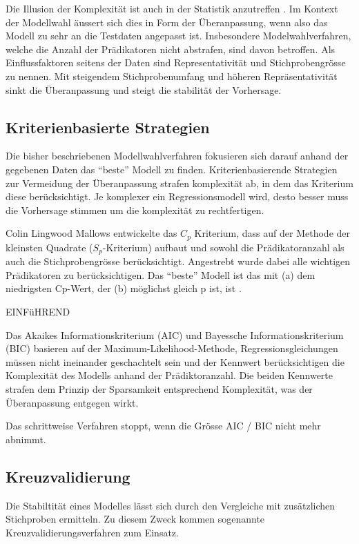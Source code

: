 \documentclass[english,12pt,doc]{apa}
\begin{document}
Die Illusion der Komplexität ist auch in der Statistik anzutreffen \cite[p. 3]{armstrong2011illusions}. 
Im Kontext der Modellwahl äussert sich dies in Form der Überanpassung, wenn also das Modell zu sehr an die Testdaten angepasst ist.
Insbesondere Modelwahlverfahren, welche die Anzahl der Prädikatoren nicht abstrafen, sind davon betroffen.
Als Einflussfaktoren seitens der Daten sind Representativität und Stichprobengrösse zu nennen. 
Mit steigendem Stichprobenumfang und höheren Repräsentativität sinkt die Überanpassung und steigt die stabilität der Vorhersage.


\subsection{Kriterienbasierte Strategien}
Die bisher beschriebenen Modellwahlverfahren fokusieren sich darauf anhand der gegebenen Daten das ``beste'' Modell zu finden.
Kriterienbasierende Strategien zur Vermeidung der Überanpassung strafen komplexität ab, in dem das Kriterium diese berücksichtigt.
Je komplexer ein Regressionsmodell wird, desto besser muss die Vorhersage stimmen um die komplexität zu rechtfertigen.

Colin Lingwood Mallows entwickelte das $C_p$ Kriterium, dass auf der Methode der kleinsten Quadrate ($S_p$-Kriterium) aufbaut und sowohl die Prädikatoranzahl als auch die Stichprobengrösse berücksichtigt. Angestrebt wurde dabei alle wichtigen Prädikatoren zu berücksichtigen. 
Das ``beste'' Modell ist das mit (a) dem niedrigsten Cp-Wert, der (b) möglichst gleich p ist, ist \cite{gilmour1996interpretation}.

EINFüHREND \cite[p.170]{weakliem2004introduction}

Das Akaikes Informationskriterium (AIC) und Bayessche Informationskriterium (BIC) basieren auf der Maximum-Likelihood-Methode, Regressionsgleichungen müssen nicht ineinander geschachtelt sein und der Kennwert berücksichtigen die Komplexität des Modells anhand der Prädiktoranzahl. 
Die beiden Kennwerte strafen dem Prinzip der Sparsamkeit entsprechend Komplexität, was der Überanpassung entgegen wirkt.

Das schrittweise Verfahren stoppt, wenn die Grösse AIC / BIC nicht mehr abnimmt.


\subsection{Kreuzvalidierung}
Die Stabiltität eines Modelles lässt sich durch den Vergleiche mit zusätzlichen Stichproben ermitteln.
Zu diesem Zweck kommen sogenannte Kreuzvalidierungsverfahren zum Einsatz.
\end{document}

